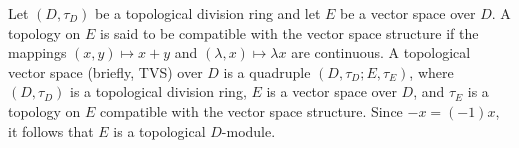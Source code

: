 Let $(D, \tau_D)$ be a topological division ring and let $E$ be a vector space over $D$. A topology on $E$ is said to be compatible with the vector space structure if the mappings $(x, y) \mapsto x + y$ and $(\lambda, x) \mapsto \lambda x$ are continuous. A topological vector space (briefly, TVS) over $D$ is a quadruple $(D, \tau_D; E, \tau_E)$, where $(D, \tau_D)$ is a topological division ring, $E$ is a vector space over $D$, and $\tau_E$ is a topology on $E$ compatible with the vector space structure. Since $-x = (-1)x$, it follows that $E$ is a topological $D$-module.
